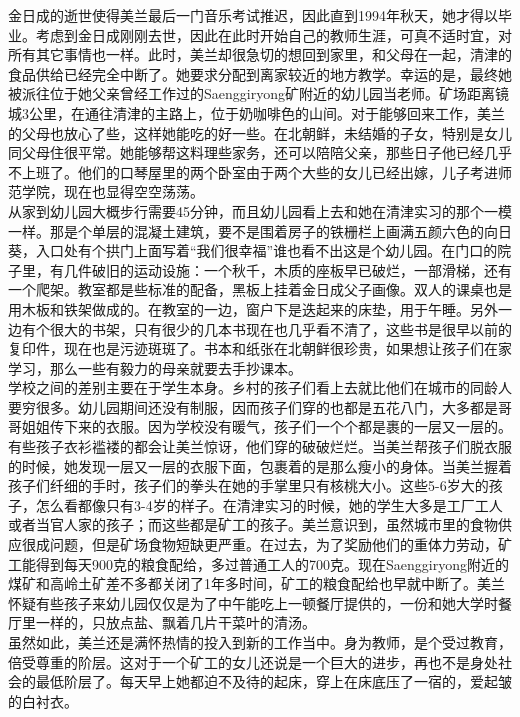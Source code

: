 \ifnum{}
	\begin{multicols}{\theparacolNo}
\fi
金日成的逝世使得美兰最后一门音乐考试推迟，因此直到1994年秋天，她才得以毕业。考虑到金日成刚刚去世，因此在此时开始自己的教师生涯，可真不适时宜，对所有其它事情也一样。此时，美兰却很急切的想回到家里，和父母在一起，清津的食品供给已经完全中断了。她要求分配到离家较近的地方教学。幸运的是，最终她被派往位于她父亲曾经工作过的Saenggiryong矿附近的幼儿园当老师。矿场距离镜城3公里，在通往清津的主路上，位于奶咖啡色的山间。对于能够回来工作，美兰的父母也放心了些，这样她能吃的好一些。在北朝鲜，未结婚的子女，特别是女儿同父母住很平常。她能够帮这料理些家务，还可以陪陪父亲，那些日子他已经几乎不上班了。他们的口琴屋里的两个卧室由于两个大些的女儿已经出嫁，儿子考进师范学院，现在也显得空空荡荡。\\

从家到幼儿园大概步行需要45分钟，而且幼儿园看上去和她在清津实习的那个一模一样。那是个单层的混凝土建筑，要不是围着房子的铁栅栏上画满五颜六色的向日葵，入口处有个拱门上面写着“我们很幸福”谁也看不出这是个幼儿园。在门口的院子里，有几件破旧的运动设施：一个秋千，木质的座板早已破烂，一部滑梯，还有一个爬架。教室都是些标准的配备，黑板上挂着金日成父子画像。双人的课桌也是用木板和铁架做成的。在教室的一边，窗户下是迭起来的床垫，用于午睡。另外一边有个很大的书架，只有很少的几本书现在也几乎看不清了，这些书是很早以前的复印件，现在也是污迹斑斑了。书本和纸张在北朝鲜很珍贵，如果想让孩子们在家学习，那么一些有毅力的母亲就要去手抄课本。\\

学校之间的差别主要在于学生本身。乡村的孩子们看上去就比他们在城市的同龄人要穷很多。幼儿园期间还没有制服，因而孩子们穿的也都是五花八门，大多都是哥哥姐姐传下来的衣服。因为学校没有暖气，孩子们一个个都是裹的一层又一层的。有些孩子衣衫褴褛的都会让美兰惊讶，他们穿的破破烂烂。当美兰帮孩子们脱衣服的时候，她发现一层又一层的衣服下面，包裹着的是那么瘦小的身体。当美兰握着孩子们纤细的手时，孩子们的拳头在她的手掌里只有核桃大小。这些5-6岁大的孩子，怎么看都像只有3-4岁的样子。在清津实习的时候，她的学生大多是工厂工人或者当官人家的孩子；而这些都是矿工的孩子。美兰意识到，虽然城市里的食物供应很成问题，但是矿场食物短缺更严重。在过去，为了奖励他们的重体力劳动，矿工能得到每天900克的粮食配给，多过普通工人的700克。现在Saenggiryong附近的煤矿和高岭土矿差不多都关闭了1年多时间，矿工的粮食配给也早就中断了。美兰怀疑有些孩子来幼儿园仅仅是为了中午能吃上一顿餐厅提供的，一份和她大学时餐厅里一样的，只放点盐、飘着几片干菜叶的清汤。\\

虽然如此，美兰还是满怀热情的投入到新的工作当中。身为教师，是个受过教育，倍受尊重的阶层。这对于一个矿工的女儿还说是一个巨大的进步，再也不是身处社会的最低阶层了。每天早上她都迫不及待的起床，穿上在床底压了一宿的，爱起皱的白衬衣。\\


\end{multicols}
